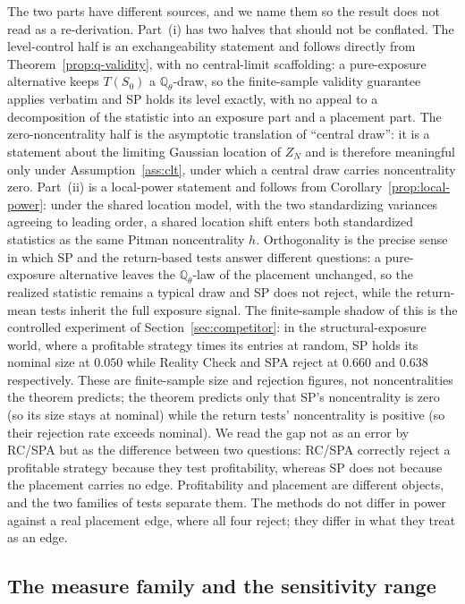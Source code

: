 \documentclass[preprint,12pt]{elsarticle}
\theoremstyle{definition}
\begin{document}
The two parts have different sources, and we name them so the result does not read
as a re-derivation. Part~(i) has two halves that should not be conflated. The
level-control half is an exchangeability statement and follows directly from
Theorem~\ref{prop:q-validity}, with no central-limit scaffolding: a pure-exposure
alternative keeps $T(S_0)$ a $\mathbb{Q}_\theta$-draw, so the finite-sample
validity guarantee applies verbatim and SP holds its level exactly, with no appeal
to a decomposition of the statistic into an exposure part and a placement part. The
zero-noncentrality half is the asymptotic translation of ``central draw'': it is a
statement about the limiting Gaussian location of $Z_N$ and is therefore meaningful
only under Assumption~\ref{ass:clt}, under which a central draw carries noncentrality
zero. Part~(ii) is a local-power statement and follows from
Corollary~\ref{prop:local-power}: under the shared location model, with the two
standardizing variances agreeing to leading order, a shared location shift enters
both standardized statistics as the same Pitman noncentrality $h$. Orthogonality
is the precise sense in which SP and the return-based tests answer different
questions: a pure-exposure alternative leaves the $\mathbb{Q}_\theta$-law of the
placement unchanged, so the realized statistic remains a typical draw and SP does
not reject, while the return-mean tests inherit the full exposure signal. The
finite-sample shadow of this is the controlled experiment of
Section~\ref{sec:competitor}: in the structural-exposure world, where a profitable
strategy times its entries at random, SP holds its nominal size at $0.050$ while
Reality Check and SPA reject at $0.660$ and $0.638$ respectively. These are
finite-sample size and rejection figures, not noncentralities the theorem
predicts; the theorem predicts only that SP's noncentrality is zero (so its size
stays at nominal) while the return tests' noncentrality is positive (so their
rejection rate exceeds nominal). We read the gap not
as an error by RC/SPA but as the difference between two questions: RC/SPA
correctly reject a profitable strategy because they test profitability, whereas SP
does not because the placement carries no edge. Profitability and placement are
different objects, and the two families of tests separate them. The methods do not
differ in power against a real placement edge, where all four reject; they differ
in what they treat as an edge.

\subsection{The measure family and the sensitivity range}
\label{sec:measure-family}
\end{document}
